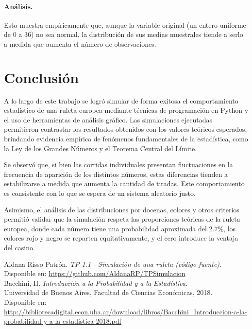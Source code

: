 \documentclass{article}
\begin{document}
\paragraph{Análisis.}Esto muestra empíricamente que, aunque la variable original (un entero uniforme de 0 a 36) no sea normal, la distribución de sus medias muestrales tiende a serlo a medida que aumenta el número de observaciones.

\section{Conclusión}
A lo largo de este trabajo se logró simular de forma exitosa el comportamiento estadístico de una ruleta europea mediante técnicas de programación en Python y el uso de herramientas de análisis gráfico. Las simulaciones ejecutadas permitieron contrastar los resultados obtenidos con los valores teóricos esperados, brindando evidencia empírica de fenómenos fundamentales de la estadística, como la Ley de los Grandes Números y el Teorema Central del Límite.

Se observó que, si bien las corridas individuales presentan fluctuaciones en la frecuencia de aparición de los distintos números, estas diferencias tienden a estabilizarse a medida que aumenta la cantidad de tiradas. Este comportamiento es consistente con lo que se espera de un sistema aleatorio justo.

Asimismo, el análisis de las distribuciones por docenas, colores y otros criterios permitió validar que la simulación respeta las proporciones teóricas de la ruleta europea, donde cada número tiene una probabilidad aproximada del 2.7\%, los colores rojo y negro se reparten equitativamente, y el cero introduce la ventaja del casino.

  
\begin{thebibliography}{2}

Aldana Risso Patrón. \textit{TP 1.1 - Simulación de una ruleta (código fuente)}.\\
Disponible en: \url{https://github.com/AldanaRP/TPSimulacion} \\

Bacchini, H. \textit{Introducción a la Probabilidad y a la Estadística}.\\
Universidad de Buenos Aires, Facultad de Ciencias Económicas, 2018.\\
Disponible en: \url{http://bibliotecadigital.econ.uba.ar/download/libros/Bacchini_Introduccion-a-la-probabilidad-y-a-la-estadistica-2018.pdf}

\end{thebibliography}
\end{document}
